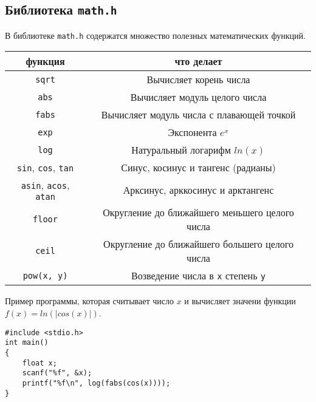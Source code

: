 \documentclass{article}
\begin{document}
\subsection*{Библиотека \texttt{math.h}}
В библиотеке \texttt{math.h} содержатся множество полезных математических функций.

\begin{center}
\begin{tabular}{ c c }
 функция & что делает \\ \hline
 \texttt{sqrt}     & Вычисляет корень числа \\ 
 \texttt{abs}      & Вычисляет модуль целого числа \\ 
 \texttt{fabs}     & Вычисляет модуль числа с плавающей точкой \\ 
 \texttt{exp}      & Экспонента $e^x$ \\ 
 \texttt{log}      & Натуральный логарифм $ln(x)$ \\
 \texttt{sin}, \texttt{cos},  \texttt{tan} & Синус, косинус и тангенс (радианы) \\ 
 \texttt{asin}, \texttt{acos},  \texttt{atan} & Арксинус, арккосинус и арктангенс \\ 
 \texttt{floor}      & Округление до ближайшего меньшего целого числа \\
 \texttt{ceil}       & Округление до ближайшего большего целого числа \\
 \texttt{pow(x, y)}        & Возведение числа в \texttt{x} степень \texttt{y} \\
\end{tabular}
\end{center}

Пример программы, которая считывает число $x$ и вычисляет значени функции $f(x) = ln(|cos(x)|)$.
\begin{lstlisting}
#include <stdio.h>
int main() 
{
    float x;
    scanf("%f", &x);
    printf("%f\n", log(fabs(cos(x))));
}
\end{lstlisting}
\end{document}
